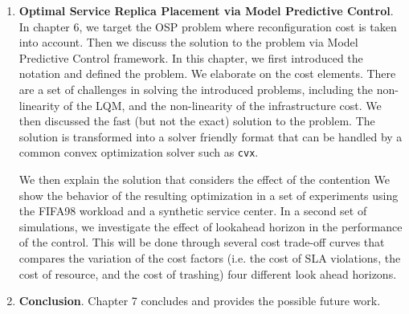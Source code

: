 \documentclass[11pt]{article}
\begin{document}
\begin{enumerate}
   \item  \textbf{Optimal Service Replica Placement via Model Predictive Control}. 
 In chapter 6, we target the OSP problem where reconfiguration cost is taken into account. Then we discuss the solution to the problem via Model Predictive Control framework.  
In this chapter, we first introduced the notation and defined the problem.
We elaborate on the cost elements. 
There are a set of challenges in solving the introduced problems, including the non-linearity of the LQM, and the non-linearity of the infrastructure cost.
We then discussed the fast (but not the exact) solution to the problem. The solution is transformed into a solver friendly format that can be handled by a common convex optimization solver such as \texttt{cvx}.

We then explain the solution that considers the effect of the contention
We show the behavior of the resulting optimization in a set of experiments using the FIFA98 workload and a synthetic service center. In a second set of simulations, we investigate the effect of lookahead horizon in the performance of the control. This will be done through several cost trade-off curves that compares the variation of the cost factors (i.e. the cost of SLA violations, the cost of resource, and the cost of trashing) four different look ahead horizons.
 
\item \textbf{Conclusion}. Chapter 7 concludes and provides the possible future work.  

\end{enumerate}




\end{document}
